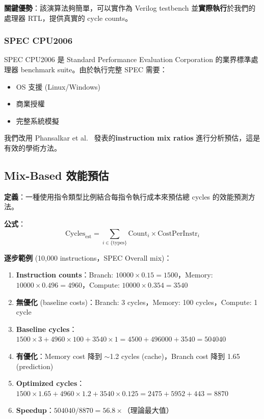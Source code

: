 \documentclass[journal]{IEEEtran}
\begin{document}
\textbf{關鍵優勢}：該演算法夠簡單，可以實作為 Verilog testbench 並\textbf{實際執行}於我們的處理器 RTL，提供真實的 cycle counts。

\subsubsection{SPEC CPU2006}
SPEC CPU2006 是 Standard Performance Evaluation Corporation 的業界標準處理器 benchmark suite。由於執行完整 SPEC 需要：
\begin{itemize}
    \item OS 支援 (Linux/Windows)
    \item 商業授權
    \item 完整系統模擬
\end{itemize}
我們改用 Phansalkar et al.~\cite{phansalkar2007analysis} 發表的\textbf{instruction mix ratios} 進行分析預估，這是有效的學術方法。

\subsection{Mix-Based 效能預估}
\textbf{定義}：一種使用指令類型比例結合每指令執行成本來預估總 cycles 的效能預測方法。

\textbf{公式}：
\begin{equation}
\text{Cycles}_{\text{est}} = \sum_{i \in \{\text{types}\}} \text{Count}_i \times \text{CostPerInstr}_i
\label{eq:mixproj}
\end{equation}

\textbf{逐步範例} (10,000 instructions，SPEC Overall mix)：
\begin{enumerate}
    \item \textbf{Instruction counts}：Branch: $10000 \times 0.15 = 1500$，Memory: $10000 \times 0.496 = 4960$，Compute: $10000 \times 0.354 = 3540$
    \item \textbf{無優化} (baseline costs)：Branch: 3 cycles，Memory: 100 cycles，Compute: 1 cycle
    \item \textbf{Baseline cycles}：$1500 \times 3 + 4960 \times 100 + 3540 \times 1 = 4500 + 496000 + 3540 = 504040$
    \item \textbf{有優化}：Memory cost 降到 $\sim$1.2 cycles (cache)，Branch cost 降到 1.65 (prediction)
    \item \textbf{Optimized cycles}：$1500 \times 1.65 + 4960 \times 1.2 + 3540 \times 0.125 = 2475 + 5952 + 443 = 8870$
    \item \textbf{Speedup}：$504040 / 8870 = 56.8\times$（理論最大值）
\end{enumerate}
\end{document}
